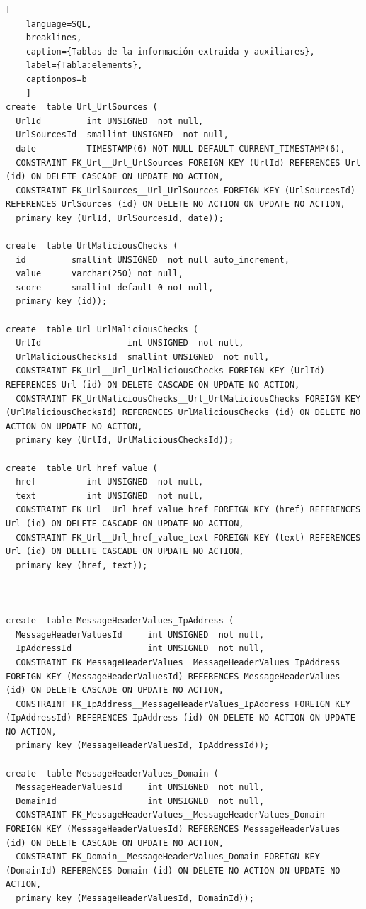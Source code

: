 \begin{lstlisting}[
    language=SQL,
    breaklines, 
    caption={Tablas de la información extraida y auxiliares}, 
    label={Tabla:elements}, 
    captionpos=b
    ]
create  table Url_UrlSources (
  UrlId         int UNSIGNED  not null, 
  UrlSourcesId  smallint UNSIGNED  not null,
  date          TIMESTAMP(6) NOT NULL DEFAULT CURRENT_TIMESTAMP(6),
  CONSTRAINT FK_Url__Url_UrlSources FOREIGN KEY (UrlId) REFERENCES Url (id) ON DELETE CASCADE ON UPDATE NO ACTION,
  CONSTRAINT FK_UrlSources__Url_UrlSources FOREIGN KEY (UrlSourcesId) REFERENCES UrlSources (id) ON DELETE NO ACTION ON UPDATE NO ACTION,
  primary key (UrlId, UrlSourcesId, date));

create  table UrlMaliciousChecks (
  id         smallint UNSIGNED  not null auto_increment, 
  value      varchar(250) not null, 
  score      smallint default 0 not null, 
  primary key (id));

create  table Url_UrlMaliciousChecks (
  UrlId                 int UNSIGNED  not null, 
  UrlMaliciousChecksId  smallint UNSIGNED  not null,
  CONSTRAINT FK_Url__Url_UrlMaliciousChecks FOREIGN KEY (UrlId) REFERENCES Url (id) ON DELETE CASCADE ON UPDATE NO ACTION,
  CONSTRAINT FK_UrlMaliciousChecks__Url_UrlMaliciousChecks FOREIGN KEY (UrlMaliciousChecksId) REFERENCES UrlMaliciousChecks (id) ON DELETE NO ACTION ON UPDATE NO ACTION,
  primary key (UrlId, UrlMaliciousChecksId));
  
create  table Url_href_value (
  href          int UNSIGNED  not null, 
  text          int UNSIGNED  not null, 
  CONSTRAINT FK_Url__Url_href_value_href FOREIGN KEY (href) REFERENCES Url (id) ON DELETE CASCADE ON UPDATE NO ACTION,
  CONSTRAINT FK_Url__Url_href_value_text FOREIGN KEY (text) REFERENCES Url (id) ON DELETE CASCADE ON UPDATE NO ACTION,
  primary key (href, text));



create  table MessageHeaderValues_IpAddress (
  MessageHeaderValuesId     int UNSIGNED  not null, 
  IpAddressId               int UNSIGNED  not null,
  CONSTRAINT FK_MessageHeaderValues__MessageHeaderValues_IpAddress FOREIGN KEY (MessageHeaderValuesId) REFERENCES MessageHeaderValues (id) ON DELETE CASCADE ON UPDATE NO ACTION,
  CONSTRAINT FK_IpAddress__MessageHeaderValues_IpAddress FOREIGN KEY (IpAddressId) REFERENCES IpAddress (id) ON DELETE NO ACTION ON UPDATE NO ACTION,
  primary key (MessageHeaderValuesId, IpAddressId));

create  table MessageHeaderValues_Domain (
  MessageHeaderValuesId     int UNSIGNED  not null, 
  DomainId                  int UNSIGNED  not null,
  CONSTRAINT FK_MessageHeaderValues__MessageHeaderValues_Domain FOREIGN KEY (MessageHeaderValuesId) REFERENCES MessageHeaderValues (id) ON DELETE CASCADE ON UPDATE NO ACTION,
  CONSTRAINT FK_Domain__MessageHeaderValues_Domain FOREIGN KEY (DomainId) REFERENCES Domain (id) ON DELETE NO ACTION ON UPDATE NO ACTION,
  primary key (MessageHeaderValuesId, DomainId));


\end{lstlisting}
